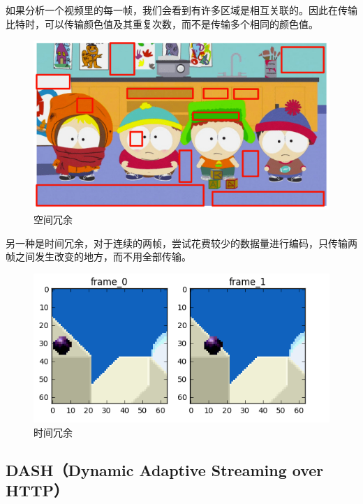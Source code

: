 如果分析一个视频里的每一帧，我们会看到有许多区域是相互关联的。因此在传输比特时，可以传输颜色值及其重复次数，而不是传输多个相同的颜色值。\\

\begin{figure}[H]
    \centering
    \includegraphics[scale=0.7]{img/Chapter2/2-7/1.png}
    \caption{空间冗余}
\end{figure}

另一种是时间冗余，对于连续的两帧，尝试花费较少的数据量进行编码，只传输两帧之间发生改变的地方，而不用全部传输。\\

\begin{figure}[H]
    \centering
    \includegraphics[scale=0.7]{img/Chapter2/2-7/2.png}
    \caption{时间冗余}
\end{figure}

\vspace{0.5cm}

\subsection{DASH（Dynamic Adaptive Streaming over HTTP）}

